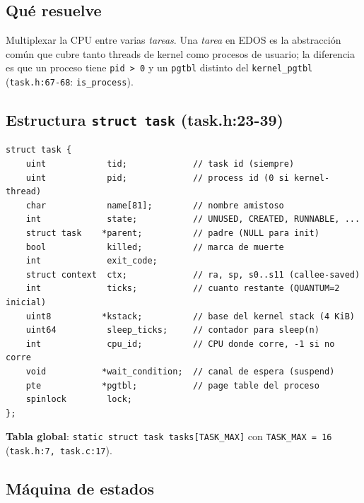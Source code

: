 \documentclass[11pt,a4paper]{article}
\begin{document}
\subsection*{Qué resuelve}

Multiplexar la CPU entre varias \emph{tareas}. Una \emph{tarea} en
EDOS es la abstracción común que cubre tanto threads de kernel como
procesos de usuario; la diferencia es que un proceso tiene
\texttt{pid > 0} y un \texttt{pgtbl} distinto del \texttt{kernel\_pgtbl}
(\texttt{task.h:67-68}: \texttt{is\_process}).

\subsection*{Estructura \texttt{struct task} (task.h:23-39)}

\begin{lstlisting}[style=cstyle]
struct task {
    uint            tid;             // task id (siempre)
    uint            pid;             // process id (0 si kernel-thread)
    char            name[81];        // nombre amistoso
    int             state;           // UNUSED, CREATED, RUNNABLE, ...
    struct task    *parent;          // padre (NULL para init)
    bool            killed;          // marca de muerte
    int             exit_code;
    struct context  ctx;             // ra, sp, s0..s11 (callee-saved)
    int             ticks;           // cuanto restante (QUANTUM=2 inicial)
    uint8          *kstack;          // base del kernel stack (4 KiB)
    uint64          sleep_ticks;     // contador para sleep(n)
    int             cpu_id;          // CPU donde corre, -1 si no corre
    void           *wait_condition;  // canal de espera (suspend)
    pte            *pgtbl;           // page table del proceso
    spinlock        lock;
};
\end{lstlisting}

\textbf{Tabla global}: \texttt{static struct task tasks[TASK\_MAX]}
con \texttt{TASK\_MAX = 16} (\texttt{task.h:7, task.c:17}).

\subsection*{Máquina de estados}
\end{document}
